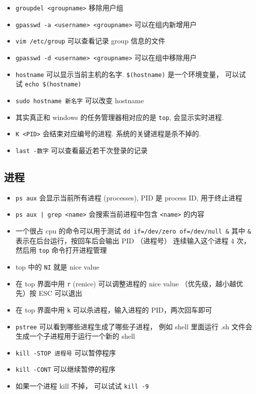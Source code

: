 \begin{itemize}
\item \verb`groupdel <groupname>` 移除用户组
\item \verb`gpasswd -a <username> <groupname>` 可以在组内新增用户
\item \verb`vim /etc/group` 可以查看记录 group 信息的文件
\item \verb`gpasswd -d <username> <groupname>` 可以在组中移除用户
\item \verb`hostname` 可以显示当前主机的名字. \verb`$(hostname)` 是一个环境变量， 可以试试 \verb`echo $(hostname)`
\item \verb|sudo hostname 新名字| 可以改变 hostname
\item 其实真正和 windows 的任务管理器相对应的是 \verb`top`, 会显示实时进程. 
\item \verb`K <PID>` 会结束对应编号的进程. 系统的关键进程是杀不掉的.
\item \verb`last -数字` 可以查看最近若干次登录的记录
\end{itemize}

\subsection{进程}
\begin{itemize}
\item \verb`ps aux` 会显示当前所有进程 (processes), PID 是 process ID, 用于终止进程
\item \verb`ps aux | grep <name>` 会搜索当前进程中包含 \verb`<name>` 的内容
\item 一个很占 cpu 的命令可以用于测试
\verb`dd if=/dev/zero of=/dev/null &`
其中 \verb`&` 表示在后台运行，按回车后会输出 PID （进程号）
连续输入这个进程 4 次， 然后用 \verb`top` 命令打开进程管理
\item top 中的 \verb`NI` 就是 nice value
\item 在 top 界面中用 \verb`r` (renice) 可以调整进程的 nice value （优先级，越小越优先）按 ESC 可以退出
\item 在 top 界面中用 \verb`k` 可以杀进程，输入进程的 PID，两次回车即可
\item \verb`pstree` 可以看到哪些进程生成了哪些子进程， 例如 shell 里面运行 .sh 文件会生成一个子进程用于运行一个新的 shell
\item \verb`kill -STOP 进程号` 可以暂停程序
\item \verb`kill -CONT` 可以继续暂停的程序
\item 如果一个进程 kill 不掉， 可以试试 \verb|kill -9|
\end{itemize}

